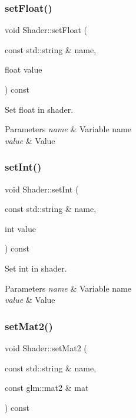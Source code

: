 \subsubsection{\texorpdfstring{set\+Float()}{setFloat()}}
{\footnotesize\ttfamily void Shader\+::set\+Float (\begin{DoxyParamCaption}\item[{const std\+::string \&}]{name,  }\item[{float}]{value }\end{DoxyParamCaption}) const}



Set float in shader. 


\begin{DoxyParams}{Parameters}
{\em name} & Variable name \\
\hline
{\em value} & Value \\
\hline
\end{DoxyParams}
\mbox{\label{class_shader_ad362e2b654cd95a3574cd505411e41fd}} 
\subsubsection{\texorpdfstring{set\+Int()}{setInt()}}
{\footnotesize\ttfamily void Shader\+::set\+Int (\begin{DoxyParamCaption}\item[{const std\+::string \&}]{name,  }\item[{int}]{value }\end{DoxyParamCaption}) const}



Set int in shader. 


\begin{DoxyParams}{Parameters}
{\em name} & Variable name \\
\hline
{\em value} & Value \\
\hline
\end{DoxyParams}
\mbox{\label{class_shader_a91a6ee79b959cacd618c9e29a5bbd732}} 
\subsubsection{\texorpdfstring{set\+Mat2()}{setMat2()}}
{\footnotesize\ttfamily void Shader\+::set\+Mat2 (\begin{DoxyParamCaption}\item[{const std\+::string \&}]{name,  }\item[{const glm\+::mat2 \&}]{mat }\end{DoxyParamCaption}) const}



